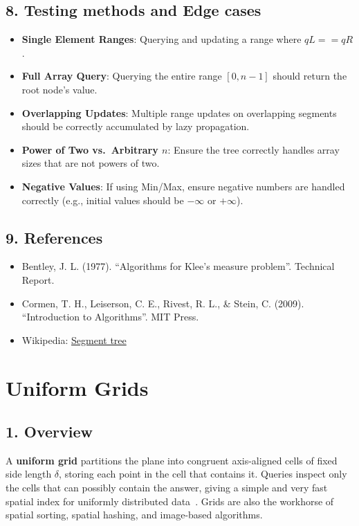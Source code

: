 \subsection{8. Testing methods and Edge cases}
\begin{itemize}
    \item \textbf{Single Element Ranges}: Querying and updating a range where $qL == qR$.
    \item \textbf{Full Array Query}: Querying the entire range $[0, n-1]$ should return the root node's value.
    \item \textbf{Overlapping Updates}: Multiple range updates on overlapping segments should be correctly accumulated by lazy propagation.
    \item \textbf{Power of Two vs.\ Arbitrary $n$}: Ensure the tree correctly handles array sizes that are not powers of two.
    \item \textbf{Negative Values}: If using Min/Max, ensure negative numbers are handled correctly (e.g., initial values should be $-\infty$ or $+\infty$).
\end{itemize}

\subsection{9. References}
\begin{itemize}
    \item Bentley, J. L. (1977). ``Algorithms for Klee's measure problem''. Technical Report.
    \item Cormen, T. H., Leiserson, C. E., Rivest, R. L., \& Stein, C. (2009). ``Introduction to Algorithms''. MIT Press.
    \item Wikipedia: \href{https://en.wikipedia.org/wiki/Segment_tree}{Segment tree}
\end{itemize}

\section{Uniform Grids}
\label{sec:uniform_grids}

\subsection{1. Overview}
A \textbf{uniform grid} partitions the plane into congruent axis-aligned cells of fixed side length $\delta$, storing each point in the cell that contains it. Queries inspect only the cells that can possibly contain the answer, giving a simple and very fast spatial index for uniformly distributed data~\cite{berg2008}. Grids are also the workhorse of spatial sorting, spatial hashing, and image-based algorithms.

